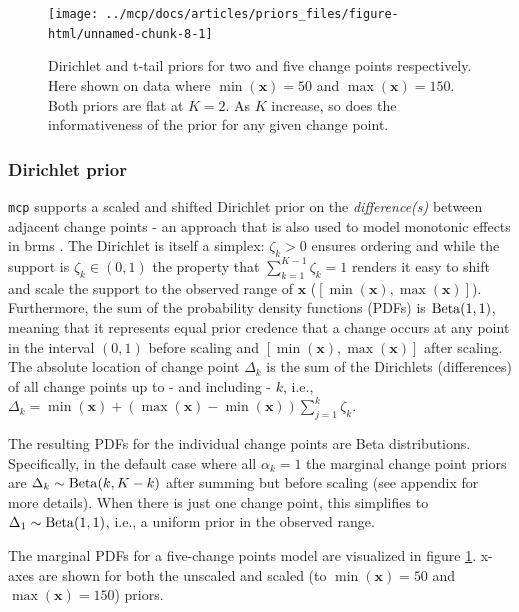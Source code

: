 \documentclass[
  american,
]{article}
\begin{document}
\begin{figure}
\texttt{[image: ../mcp/docs/articles/priors\_files/figure-html/unnamed-chunk-8-1]} \caption{Dirichlet and t-tail priors for two and five change points respectively. Here shown on data where \(\min(\mathbf{x}) = 50\) and \(\max(\mathbf{x}) = 150\). Both priors are flat at \(K = 2\). As \(K\) increase, so does the informativeness of the prior for any given change point.}\label{fig:defaultpriors}
\end{figure}

\hypertarget{dirichlet}{%
\subsubsection{Dirichlet prior}\label{dirichlet}}

\texttt{mcp} supports a scaled and shifted Dirichlet prior on the \emph{difference(s)} between adjacent change points - an approach that is also used to model monotonic effects in brms \citep{burkner2018}. The Dirichlet is itself a simplex: \(\zeta_k > 0\) ensures ordering and while the support is \(\zeta_k \in (0, 1)\) the property that \(\sum_{k=1}^{K-1} \zeta_k = 1\) renders it easy to shift and scale the support to the observed range of \(\mathbf{x}\) (\([\min(\mathbf{x}), \max(\mathbf{x})]\)). Furthermore, the sum of the probability density functions (PDFs) is \({\rm Beta}(1, 1)\), meaning that it represents equal prior credence that a change occurs at any point in the interval \((0, 1)\) before scaling and \([\min(\mathbf{x}), \max(\mathbf{x})]\) after scaling. The absolute location of change point \(\Delta_k\) is the sum of the Dirichlets (differences) of all change points up to - and including - \(k\), i.e., \(\Delta_k = \min(\mathbf{x}) + (\max(\mathbf{x}) - \min(\mathbf{x})) \sum_{j = 1}^k \zeta_k\).

The resulting PDFs for the individual change points are Beta distributions. Specifically, in the default case where all \(\alpha_k = 1\) the marginal change point priors are \(\Delta_k \sim {\rm Beta}(k, K - k)\) after summing but before scaling (see appendix for more details). When there is just one change point, this simplifies to \(\Delta_1 \sim {\rm Beta}(1, 1)\), i.e., a uniform prior in the observed range.

The marginal PDFs for a five-change points model are visualized in figure \ref{fig:defaultpriors}. x-axes are shown for both the unscaled and scaled (to \(\min(\mathbf{x}) = 50\) and \(\max(\mathbf{x}) = 150\)) priors.
\end{document}
